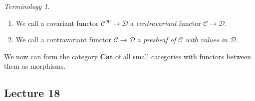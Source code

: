 \documentclass[10pt,letterpaper,cm]{nupset}
\theoremstyle{definition}
\theoremstyle{theorem}
\theoremstyle{remark}
\newtheorem*{term}{Terminology}
\newcommand{\1}{\mathbf{1}}
\renewcommand{\c}{\mathscr{C}}
\renewcommand{\d}{\mathscr{D}}
\newcommand{\0}{\vec 0}
\DeclareMathOperator{\op}{op}
\begin{document}
\begin{term} $ $
\begin{enumerate}
\item We call  a covariant functor  $\c^{\op} \to \d$ a \textit{contravariant} functor $\c \to \d$.
\item We call a contravariant functor $\c \to \d$ a \textit{presheaf of $\c$ with values in $\d$}.
\end{enumerate}
\end{term}

\smallskip

We now can form the category $\mathbf{Cat}$ of all small categories with functors between them as morphisms.

\subsection{Lecture 18}
\end{document}
